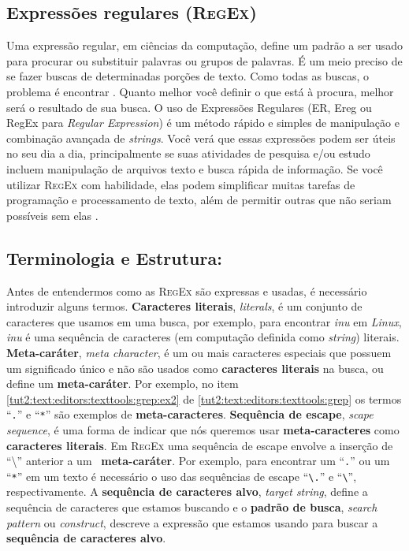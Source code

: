 \begin{refsection}
\section{Expressões regulares (\textsc{RegEx})}\label{tut2:regex}
Uma expressão regular, em ciências da computação, define um padrão a ser usado para procurar ou substituir palavras ou grupos de palavras.  É um meio preciso de se fazer buscas de determinadas porções de texto. Como todas as buscas, o problema é encontrar \parencite{Wunchiers_2004}. Quanto melhor você definir o que está à procura, melhor será o resultado de sua busca. O uso de Expressões Regulares (ER, Ereg ou RegEx para \textit{Regular Expression}) é um método rápido e simples de manipulação e combinação avançada de \textit{strings}. Você verá que essas expressões podem ser úteis no seu dia a dia, principalmente se suas atividades de pesquisa e/ou estudo incluem manipulação de arquivos texto e busca rápida de informação. Se você utilizar \textsc{RegEx} com habilidade, elas podem simplificar muitas tarefas de programação e processamento de texto, além de permitir outras que não seriam possíveis sem elas \parencite [] [] {Goyvaerts_and_Levitahn_2009}.\\

\subsection{Terminologia e Estrutura:}\label{tut2:regex:structure}

Antes de entendermos como as \textsc{RegEx} são expressas e usadas, é necessário introduzir alguns termos. \textbf{Caracteres literais}, \textit{literals}, é um conjunto de caracteres que usamos em uma busca, por exemplo, para encontrar \textit{inu} em \textit{Linux}, \textit{inu} é uma sequência de caracteres (em computação definida como \textit{string}) literais. \textbf{Meta-caráter}, \textit{meta character}, é um ou mais caracteres especiais que possuem um significado único e não são usados como \textbf{caracteres literais} na busca, ou define um \textbf{meta-caráter}. Por exemplo, no item \ref{tut2:text:editors:texttools:grep:ex2} de \ref{tut2:text:editors:texttools:grep} os termos ``\texttt{.}'' e ``\texttt{*}'' são exemplos de \textbf{meta-caracteres}. \textbf{Sequência de escape}, \textit{scape sequence}, é uma forma de indicar que nós queremos usar \textbf{meta-caracteres} como \textbf{caracteres literais}. Em \textsc{RegEx} uma sequência de escape envolve a inserção de ``\textbackslash {}'' anterior a um \
\textbf{meta-caráter}. Por exemplo, para encontrar um ``\texttt{.}'' ou um ``\texttt{*}'' em um texto é necessário o uso das sequências de escape ``\texttt{\textbackslash .}'' e ``\texttt{\textbackslash *}'', respectivamente. A \textbf{sequência de caracteres alvo}, \textit{target string}, define a sequência de caracteres que estamos buscando e o \textbf{padrão de busca}, \textit{search pattern} ou \textit{construct}, descreve a expressão que estamos usando para buscar a \textbf{sequência de caracteres alvo}.\\


\end{refsection}
